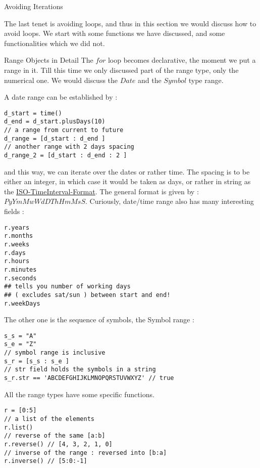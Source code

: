 \begin{section}{Avoiding Iterations}

The last tenet is avoiding loops, and thus in this section we would discuss how to avoid loops.
We start with some functions we have discussed, and some functionalities which we did not. 

\begin{subsection}{Range Objects in Detail}
  
The $for$ loop becomes declarative, the moment we put a range in it.
Till this time we only discussed part of the range type, only the numerical one.
We would discuss the $Date$ and the $Symbol$ type range.

A date range can be established by :

\begin{lstlisting}[style=JexlStyle]
d_start = time()
d_end = d_start.plusDays(10)
// a range from current to future 
d_range = [d_start : d_end ]
// another range with 2 days spacing 
d_range_2 = [d_start : d_end : 2 ]
\end{lstlisting}
and this way, we can iterate over the dates or rather time.
The spacing is to be either an integer, in which case it would be 
taken as days, or rather in string as the \href{https://en.wikipedia.org/wiki/ISO_8601#Time_intervals}{ISO-TimeInterval-Format}.
The general format is given by :  $PyYmMwWdDThHmMsS$.
Curiously, date/time range also has many interesting fields :

\begin{lstlisting}[style=JexlStyle]
r.years 
r.months 
r.weeks 
r.days 
r.hours 
r.minutes 
r.seconds 
## tells you number of working days 
## ( excludes sat/sun ) between start and end!
r.weekDays 
\end{lstlisting}

The other one is the sequence of symbols, the Symbol range  :
\begin{lstlisting}[style=JexlStyle]
s_s = "A"
s_e = "Z" 
// symbol range is inclusive
s_r = [s_s : s_e ]
// str field holds the symbols in a string 
s_r.str == 'ABCDEFGHIJKLMNOPQRSTUVWXYZ' // true 
\end{lstlisting}

All the range types have some specific functions.

\begin{lstlisting}[style=JexlStyle]
r = [0:5]
// a list of the elements  
r.list()
// reverse of the same [a:b] 
r.reverse() // [4, 3, 2, 1, 0]
// inverse of the range : reversed into [b:a] 
r.inverse() // [5:0:-1]  
\end{lstlisting}
\end{subsection}


\end{section}
